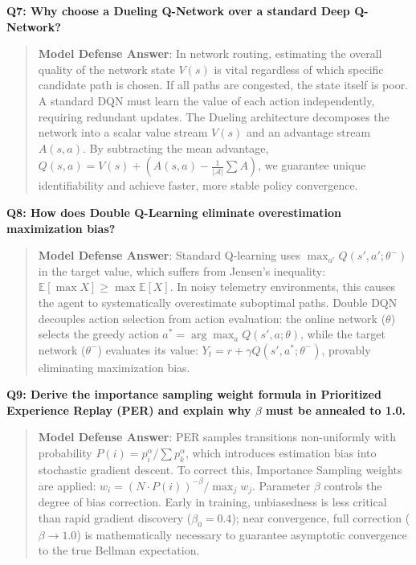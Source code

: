 \noindent\textbf{Q7: Why choose a Dueling Q-Network over a standard Deep Q-Network?}
\begin{quote}
\small
\textbf{Model Defense Answer}: In network routing, estimating the overall quality of the network state $V(s)$ is vital regardless of which specific candidate path is chosen. If all paths are congested, the state itself is poor. A standard DQN must learn the value of each action independently, requiring redundant updates. The Dueling architecture decomposes the network into a scalar value stream $V(s)$ and an advantage stream $A(s, a)$. By subtracting the mean advantage, $Q(s, a) = V(s) + (A(s, a) - \frac{1}{|\mathcal{A}|}\sum A)$, we guarantee unique identifiability and achieve faster, more stable policy convergence.
\end{quote}

\noindent\textbf{Q8: How does Double Q-Learning eliminate overestimation maximization bias?}
\begin{quote}
\small
\textbf{Model Defense Answer}: Standard Q-learning uses $\max_{a'} Q(s', a'; \theta^-)$ in the target value, which suffers from Jensen's inequality: $\mathbb{E}[\max X] \ge \max \mathbb{E}[X]$. In noisy telemetry environments, this causes the agent to systematically overestimate suboptimal paths. Double DQN decouples action selection from action evaluation: the online network ($\theta$) selects the greedy action $a^* = \arg\max_a Q(s', a; \theta)$, while the target network ($\theta^-$) evaluates its value: $Y_t = r + \gamma Q(s', a^*; \theta^-)$, provably eliminating maximization bias.
\end{quote}

\noindent\textbf{Q9: Derive the importance sampling weight formula in Prioritized Experience Replay (PER) and explain why $\beta$ must be annealed to 1.0.}
\begin{quote}
\small
\textbf{Model Defense Answer}: PER samples transitions non-uniformly with probability $P(i) = p_i^\alpha / \sum p_k^\alpha$, which introduces estimation bias into stochastic gradient descent. To correct this, Importance Sampling weights are applied: $w_i = (N \cdot P(i))^{-\beta} / \max_j w_j$. Parameter $\beta$ controls the degree of bias correction. Early in training, unbiasedness is less critical than rapid gradient discovery ($\beta_0 = 0.4$); near convergence, full correction ($\beta \to 1.0$) is mathematically necessary to guarantee asymptotic convergence to the true Bellman expectation.
\end{quote}

